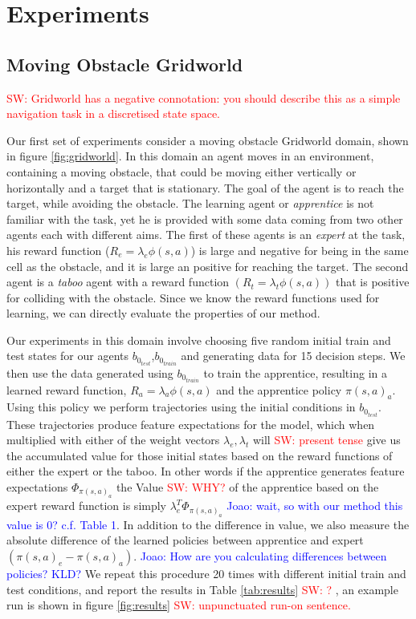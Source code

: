 \documentclass[letterpaper]{article}
\newcommand{\sw}[1]{\textcolor{red}{SW: #1}}
\newcommand{\jm}[1]{\textcolor{blue}{Joao: #1}}
\newcommand{\sw}[1]{}
\newcommand{\jm}[1]{}
\begin{document}

\section{Experiments}
\subsection{Moving Obstacle Gridworld}

\sw{Gridworld has a negative connotation: you should describe this as a simple navigation task in a discretised state space.}

Our first set of experiments consider a moving obstacle Gridworld domain, shown in figure \ref{fig:gridworld}.
In this domain an agent moves in an environment, containing a moving obstacle, that could be moving either vertically
or horizontally and a target that is stationary. The goal of the agent is to reach the target, while avoiding 
the obstacle. The learning agent or \emph{apprentice} is not familiar with the task, yet he is provided with some data coming from two other agents
each with different aims. The first of these agents is an \emph{expert} at the task, his reward function ($R_e = \lambda_e\phi(s,a)$) is large and negative
for being in the same cell as the obstacle, and it is large an positive for reaching the target. The second agent is a
\emph{taboo} agent with a reward function $(R_t=\lambda_t\phi(s,a))$ that is positive for colliding with the obstacle. Since we know the reward functions used for learning, we can directly evaluate the properties of our method. 

Our experiments in this domain involve choosing five random initial train and test states for our agents $b_{0_{test}}$,$b_{0_{train}}$ and generating data for 15 decision steps. We then use the data generated using $b_{0_{train}}$ to train the apprentice, resulting in a learned reward function, $R_a = \lambda_a\phi(s,a)$ and the apprentice policy $\pi(s,a)_a$. Using this policy we perform trajectories using the initial conditions in $b_{0_{test}}$. These trajectories produce feature expectations for the model, which when multiplied with either of the weight vectors $\lambda_e,\lambda_t$ will \sw{present tense} give us the accumulated value for those initial states based on the reward functions of either the expert or the taboo. In other words if the apprentice generates feature expectations $\Phi_{\pi(s,a)_a}$ the Value \sw{WHY?} of the apprentice based on the expert reward function is simply $\lambda_e^T\Phi_{\pi(s,a)_a}$ \jm{wait, so with our method this value is $0$? c.f. Table 1}. In addition to the difference in value, we also measure the absolute difference of the learned policies between apprentice and expert $(\pi(s,a)_e - \pi(s,a)_a)$. 
\jm{How are you calculating differences between policies? KLD?} We repeat this procedure 20 times with different initial train and test conditions, and report the results in Table \ref{tab:results} \sw{?} , an example run is shown in figure \ref{fig:results} \sw{unpunctuated run-on sentence.}
\end{document}
